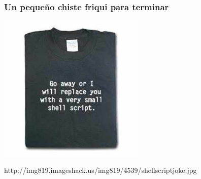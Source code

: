 
\begin{frame}
\frametitle{Un pequeño chiste friqui para terminar}

\begin{center}
  \includegraphics[width=7cm]{figs/shellscriptjoke.jpg}
\end{center}


\begin{flushright}
{\tiny
http://img819.imageshack.us/img819/4539/shellscriptjoke.jpg
}
\end{flushright}

\end{frame}

